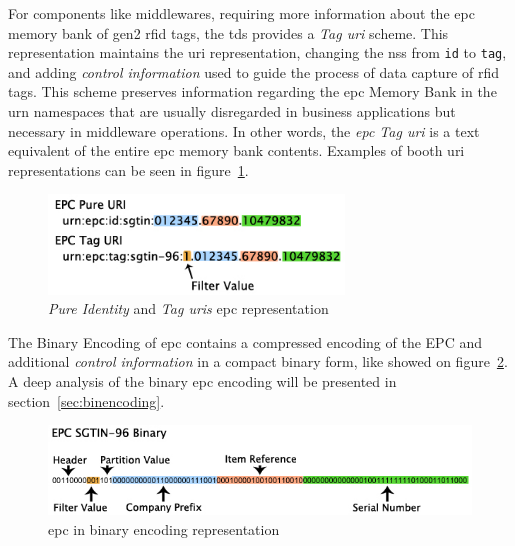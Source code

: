 For components like middlewares, requiring more information about the \ac{epc} memory bank of \ac{gen2} \ac{rfid} tags, the \ac{tds} provides a \emph{Tag \ac{uri}} scheme.
This representation maintains the \ac{uri} representation, changing the \ac{nss} from \texttt{id} to \texttt{tag}, and adding \textit{control information} used to guide the process of data capture of \ac{rfid} tags.
This scheme preserves information regarding the \ac{epc} Memory Bank in the \ac{urn} namespaces that are usually disregarded in business applications but necessary in middleware operations.
In other words, the \emph{\ac{epc} Tag \ac{uri}} is a text equivalent of the entire \ac{epc} memory bank contents.
Examples of booth \ac{uri} representations can be seen in figure~\ref{fig:epcurirepresentation}. 

\begin{figure}[!ht]
    \centering
    \includegraphics[width=0.7\textwidth]{./figs/02-state-of-the-art/SGTIN_First2encodings.jpg}
    \caption[\emph{Pure Identity} and \emph{Tag \acp{uri}} \ac{epc} representation]{\emph{Pure Identity} and \emph{Tag \acp{uri}} \ac{epc} representation~\cite{SGTININFO}} 
    \label{fig:epcurirepresentation}
\end{figure}

The Binary Encoding of \ac{epc} contains a compressed encoding of the EPC and additional \textit{control information} in a compact binary form, like showed on figure~\ref{fig:epcbinencoding}.
A deep analysis of the binary \ac{epc} encoding will be presented in section~\ref{sec:binencoding}.

\begin{figure}[!ht]
    \centering
    \includegraphics[width=\textwidth]{./figs/02-state-of-the-art/SGTIN_binaryconv2.jpg}
    \caption[\ac{epc} in binary encoding representation]{\ac{epc} in binary encoding representation~\cite{SGTININFO}} 
    \label{fig:epcbinencoding}
\end{figure}

